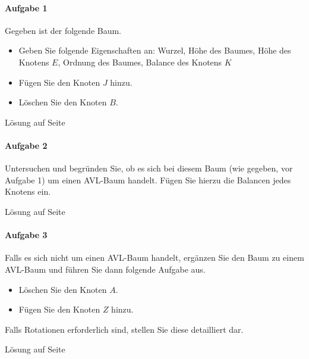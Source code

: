\documentclass[11pt,a4paper]{scrartcl}
\begin{document}
\paragraph{Aufgabe 1} Gegeben ist der folgende Baum.
\begin{itemize}
\item Geben Sie folgende Eigenschaften an: Wurzel, Höhe des Baumes, Höhe des Knotens $E$, Ordnung des Baumes, Balance des Knotens $K$
\item Fügen Sie den Knoten $J$ hinzu.
\item Löschen Sie den Knoten $B$.
\end{itemize}
\begin{figure}[h]
\centering
{}
\end{figure}
\begin{flushright}
Lösung auf Seite \pageref{a4.1:lsg} \\
\end{flushright}
\paragraph{Aufgabe 2}
Untersuchen und begründen Sie, ob es sich bei diesem Baum (wie gegeben, vor Aufgabe 1) um einen AVL-Baum handelt. Fügen Sie hierzu die Balancen jedes Knotens ein. 
\begin{flushright}
Lösung auf Seite \pageref{a4.2:lsg}
\end{flushright}
\paragraph{Aufgabe 3}
Falls es sich nicht um einen AVL-Baum handelt, ergänzen Sie den Baum zu einem AVL-Baum und führen Sie dann folgende Aufgabe aus.
\begin{itemize}
\item Löschen Sie den Knoten $A$.
\item Fügen Sie den Knoten $Z$ hinzu. 
\end{itemize}
Falls Rotationen erforderlich sind, stellen Sie diese detailliert dar. 
\begin{flushright}
Lösung auf Seite \pageref{a4.3:lsg}
\end{flushright}
\end{document}
